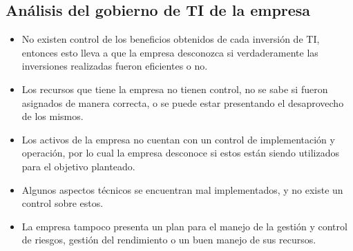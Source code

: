 \documentclass[conference]{IEEEtran}
\begin{document}
\subsection{Análisis del gobierno de TI de la empresa}
\hbox{}
    \begin{itemize}
    \item No existen control de los beneficios obtenidos de cada inversión de TI, entonces esto lleva a que la empresa desconozca si verdaderamente las inversiones realizadas fueron eficientes o no.
    \item Los recursos que tiene la empresa no tienen control, no se sabe si fueron asignados de manera correcta, o se puede estar presentando el desaprovecho de los mismos. 
    \item Los activos de la empresa no cuentan con un control de implementación y operación, por lo cual la empresa desconoce si estos están siendo utilizados para el objetivo planteado. 
    \item Algunos aspectos técnicos se encuentran mal implementados, y no existe un control sobre estos. 
    \item La empresa tampoco presenta un plan para el manejo de la gestión y control de riesgos, gestión del rendimiento o un buen manejo de sus recursos.
    \end{itemize}
\end{document}
